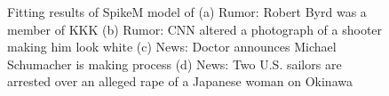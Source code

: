 \begin{figure}[!h]

  \centering


\caption{Fitting results of SpikeM model of (a) Rumor: Robert Byrd was a member of KKK (b) Rumor: CNN altered a photograph of a shooter making him look white (c) News: Doctor announces Michael Schumacher is making process (d) News: Two U.S. sailors are arrested over an alleged rape of a Japanese woman on Okinawa }
\label{fig:SPikeModel}
\end{figure}

